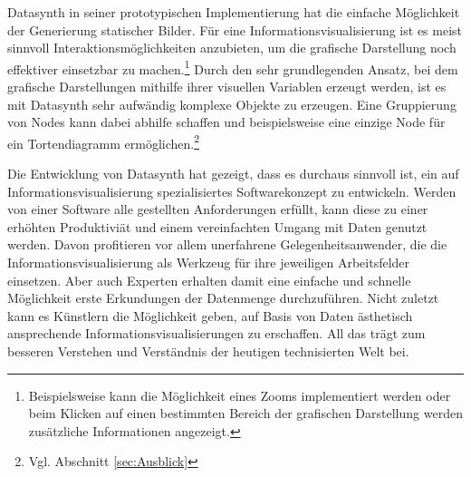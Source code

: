 \documentclass[a4paper, 12pt, DIV=calc, version=first, pdftex, headsepline, footsepline, bibtotocnumbered, liststotocnumbered]{scrreprt}
\begin{document}
Datasynth in seiner prototypischen Implementierung hat die einfache Möglichkeit der Generierung statischer Bilder.
Für eine Informationsvisualisierung ist es meist sinnvoll Interaktionsmöglichkeiten
anzubieten, um die grafische Darstellung noch effektiver einsetzbar zu machen.\footnote{Beispielsweise
kann die Möglichkeit eines Zooms implementiert werden oder beim Klicken auf einen bestimmten
Bereich der grafischen Darstellung werden zusätzliche Informationen angezeigt.}
Durch den sehr grundlegenden Ansatz, bei dem grafische Darstellungen mithilfe ihrer
visuellen Variablen erzeugt werden, ist es mit Datasynth sehr aufwändig komplexe Objekte zu erzeugen. Eine Gruppierung von Nodes
kann dabei abhilfe schaffen und beispielsweise eine einzige Node für ein 
Tortendiagramm ermöglichen.\footnote{Vgl. Abschnitt \ref{sec:Ausblick}}

Die Entwicklung von Datasynth hat gezeigt, dass es durchaus sinnvoll ist,
ein auf Informationsvisualisierung spezialisiertes Softwarekonzept zu entwickeln.
Werden von einer Software alle gestellten Anforderungen erfüllt, kann
diese zu einer erhöhten Produktiviät und einem vereinfachten Umgang mit
Daten genutzt werden. Davon profitieren vor allem unerfahrene Gelegenheitsanwender,
die die Informationsvisualisierung als Werkzeug für ihre jeweiligen Arbeitsfelder
einsetzen. Aber auch Experten erhalten damit eine einfache und schnelle Möglichkeit
erste Erkundungen der Datenmenge durchzuführen. Nicht zuletzt kann es Künstlern
die Möglichkeit geben, auf Basis von Daten ästhetisch ansprechende
Informationsvisualisierungen zu erschaffen. All das trägt zum besseren
Verstehen und Verständnis der heutigen technisierten Welt bei.
\end{document}
